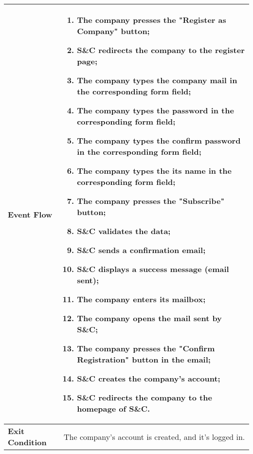 \begin{enumerate}[label=\textbf{[US\arabic*]}, left = 0pt, align = left, start=2]
\begin{longtable}{|l|p{11cm}|}
                \textbf{Event Flow} &
                    \begin{enumerate}[label=\arabic*., itemsep=0.2em]
                        \item The company presses the "Register as Company" button;
                        \item S\&C redirects the company to the register page;
                        \item The company types the company mail in the corresponding form field;
                        \item The company types the password in the corresponding form field;
                        \item The company types the confirm password in the corresponding form field;
                        \item The company types the its name in the corresponding form field;
                        \item The company presses the "Subscribe" button;
                        \item S\&C validates the data;
                        \item S\&C sends a confirmation email;
                        \item S\&C displays a success message (email sent);
                        \item The company enters its mailbox;
                        \item The company opens the mail sent by S\&C;
                        \item The company presses the "Confirm Registration" button in the email;
                        \item S\&C creates the company's account;
                        \item S\&C redirects the company to the homepage of S\&C.
                    \end{enumerate} \\
                \hline
                
                \textbf{Exit Condition} & 
                    The company's account is created, and it's logged in. \\
                \hline
                

\end{longtable}
\end{enumerate}
